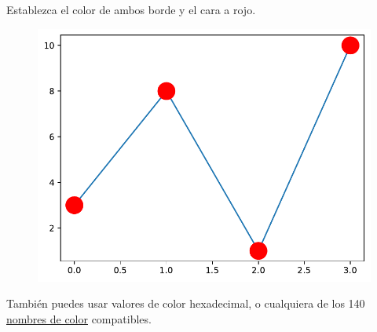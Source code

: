 \begin{code} Establezca el color de ambos borde y el cara a rojo.

\begin{Shaded}
\begin{Highlighting}[]

\OperatorTok{=}\NormalTok{ np.array([}\NormalTok{, }\NormalTok{, }\NormalTok{, }\NormalTok{])}

\OperatorTok{=} \OperatorTok{=} \OperatorTok{=} \OperatorTok{=} \NormalTok{)}
\end{Highlighting}
\end{Shaded}

\begin{figure}
  \centering
  \includegraphics[scale=0.6]{img/grafica1014.pdf}
\end{figure}

\end{code}

También puedes usar valores de color hexadecimal, o cualquiera de los
140 \href{https://www.w3schools.com/colors/colors_names.asp}{nombres de
color} compatibles.

